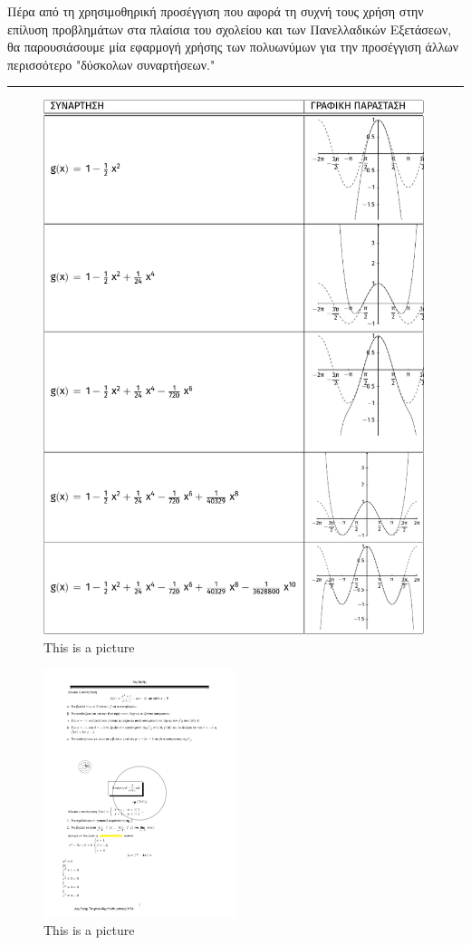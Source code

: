 \documentclass[12pt]{article}
\begin{document}
Πέρα από τη χρησιμοθηρική προσέγγιση που αφορά τη συχνή τους χρήση στην επίλυση προβλημάτων στα πλαίσια του σχολείου και των Πανελλαδικών Εξετάσεων, θα παρουσιάσουμε μία εφαρμογή χρήσης των πολυωνύμων για την προσέγγιση άλλων περισσότερο "δύσκολων συναρτήσεων."
\rule[4pt]{40pt}{1pt}
\begin{figure}[h]
	\centering	\includegraphics[width=0.99\textwidth]{tikzpic1.pdf}
\caption{This is a picture}
\end{figure}
\begin{figure}[h]
	\centering	\includegraphics[width=0.5\textwidth]{askhshfb.pdf}
	\caption{This is a picture}
\end{figure}
\end{document}
